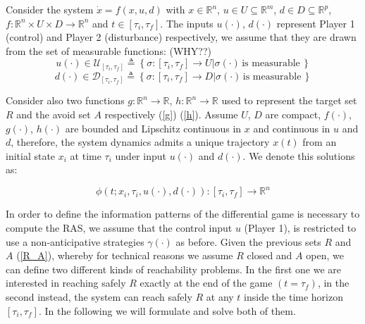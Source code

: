 Consider the system $\dot{x}=f(x, u, d)$ with $x\in\mathbb{R}^n$, $u\in U\subseteq \mathbb{R}^m$, $d\in D\subseteq \mathbb{R}^p$, $f:\mathbb{R}^n \times U \times D \rightarrow \mathbb{R}^n$ and $t \in [\tau_i, \tau_f]$. The inputs $u(\cdot)$, $d(\cdot)$ represent Player 1 (control) and Player 2 (disturbance) respectively, we assume that they are drawn from the set of measurable functions: (WHY??)
\[ 
    u(\cdot) \in \mathcal{U}_{[\tau_i, \tau_f]}  \triangleq 
    \left\{
        \sigma: [\tau_i, \tau_f] \rightarrow U| \sigma(\cdot) \, \textrm{is measurable} \, 
    \right\} 
\]
\[ 
    d(\cdot) \in \mathcal{D}_{[\tau_i, \tau_f]}  \triangleq 
    \left\{
        \sigma: [\tau_i, \tau_f] \rightarrow D| \sigma(\cdot) \, \textrm{is measurable} \, 
    \right\} 
\]

Consider also two functions $g: \mathbb{R}^n \rightarrow \mathbb{R}$, $h: \mathbb{R}^n \rightarrow \mathbb{R}$ used to represent the target set $R$ and the avoid set $A$ respectively (\ref{g}) (\ref{h}). Assume $U$, $D$ are compact, $f(\cdot)$, $g(\cdot)$, $h(\cdot)$ are bounded and  Lipschitz continuous in $x$ and continuous in $u$ and $d$, therefore, the system dynamics admits a unique trajectory $x(t)$ from an initial state $x_i$ at time $\tau_i$ under input $u(\cdot)$ and $d(\cdot)$. We denote this solutions as:

\[
    \phi(t; x_i, \tau_i, u(\cdot), d(\cdot)) : [\tau_i, \tau_f] \rightarrow \mathbb{R}^n
\]

In order to define the information patterns of the differential game is necessary to compute the RAS, we assume that the control input $u$ (Player 1), is restricted to use a non-anticipative strategies $\gamma(\cdot)$ as before.
Given the previous sets $R$ and $A$ (\ref{R_A}), whereby for technical reasons we assume $R$ closed and $A$ open, we can define two different kinds of reachability problems. In the first one we are interested in reaching safely $R$ exactly at the end of the game $(t=\tau_f)$, in the second instead, the system can reach safely $R$ at any $t$ inside the time horizon $[\tau_i, \tau_f]$. In the following we will formulate and solve both of them.

